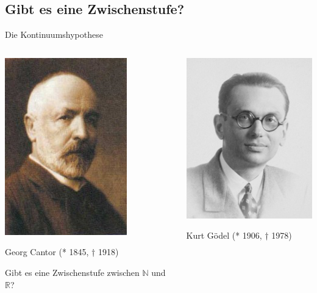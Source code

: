 \documentclass[12pt,compress,ngerman,utf8,t]{beamer}
\begin{document}
\subsection[Zwischenstufe]{Gibt es eine Zwischenstufe?}

\begin{frame}{Die Kontinuumshypothese}
  \begin{columns}[t]
    \begin{column}{0.34\textwidth}
      \centering\includegraphics[height=0.5\textheight]{georg-cantor} \\
      {\scriptsize Georg Cantor (* 1845, † 1918)\par}
      \bigskip

      Gibt es eine Zwischenstufe zwischen $\mathbb{N}$ und $\mathbb{R}$?
    \end{column}
    \pause

    \begin{column}{0.34\textwidth}
      \centering\includegraphics[height=0.5\textheight]{kurt-goedel} \\
      {\scriptsize Kurt Gödel (* 1906, † 1978)\par}
      \bigskip


\end{column}
\end{columns}
\end{frame}
\end{document}

